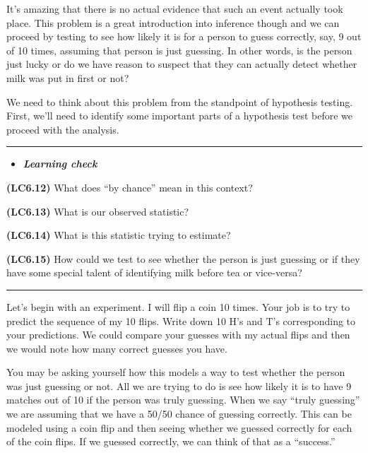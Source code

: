 \documentclass[]{tufte-book}
\let\oldrule=\rule
\renewcommand{\rule}[1]{\oldrule{\linewidth}}
\newenvironment{rmdblock}[1]
  {\begin{shaded*}
  \begin{itemize}
  \renewcommand{\labelitemi}{
    \raisebox{-.7\height}[0pt][0pt]{
    }
  }
  \item
  }
  {
  \end{itemize}
  \end{shaded*}
  }
\newenvironment{learncheck}
  {\begin{rmdblock}{warning}}
  {\end{rmdblock}}
\begin{document}
It's amazing that there is no actual evidence that such an event
actually took place. This problem is a great introduction into inference
though and we can proceed by testing to see how likely it is for a
person to guess correctly, say, 9 out of 10 times, assuming that person
is just guessing. In other words, is the person just lucky or do we have
reason to suspect that they can actually detect whether milk was put in
first or not?

We need to think about this problem from the standpoint of hypothesis
testing. First, we'll need to identify some important parts of a
hypothesis test before we proceed with the analysis.

\begin{center}\rule{0.5\linewidth}{\linethickness}\end{center}

\begin{learncheck}
\textbf{\emph{Learning check}}
\end{learncheck}

\textbf{(LC6.12)} What does ``by chance'' mean in this context?

\textbf{(LC6.13)} What is our observed statistic?

\textbf{(LC6.14)} What is this statistic trying to estimate?

\textbf{(LC6.15)} How could we test to see whether the person is just
guessing or if they have some special talent of identifying milk before
tea or vice-versa?

\begin{center}\rule{0.5\linewidth}{\linethickness}\end{center}

Let's begin with an experiment. I will flip a coin 10 times. Your job is
to try to predict the sequence of my 10 flips. Write down 10 H's and T's
corresponding to your predictions. We could compare your guesses with my
actual flips and then we would note how many correct guesses you have.

You may be asking yourself how this models a way to test whether the
person was just guessing or not. All we are trying to do is see how
likely it is to have 9 matches out of 10 if the person was truly
guessing. When we say ``truly guessing'' we are assuming that we have a
50/50 chance of guessing correctly. This can be modeled using a coin
flip and then seeing whether we guessed correctly for each of the coin
flips. If we guessed correctly, we can think of that as a ``success.''
\end{document}
